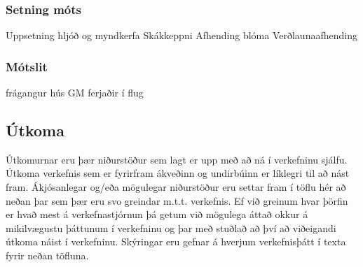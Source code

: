 \documentclass[11pt]{article}
\begin{document}
\subsubsection{Setning móts}
\label{sec-1-1-9}

Uppsetning hljóð og myndkerfa
Skákkeppni
Afhending blóma
Verðlaunaafhending
\subsubsection{Mótslit}
\label{sec-1-1-10}

frágangur hús
GM ferjaðir í flug
\subsection{Útkoma}
\label{sec-1-2}


Útkomurnar eru þær niðurstöður sem lagt er upp með að ná í verkefninu sjálfu.  Útkoma verkefnis sem er 
fyrirfram ákveðinn og undirbúinn er líklegri til að nást fram. Ákjósanlegar og/eða mögulegar niðurstöður
eru settar fram í töflu hér að neðan þar sem þær eru svo greindar m.t.t. verkefnis. Ef við greinum hvar 
þörfin er hvað mest á verkefnastjórnun þá getum við mögulega áttað okkur á mikilvægustu þáttunum í 
verkefninu og þar með stuðlað að því að viðeigandi útkoma náist í verkefninu.  Skýringar eru gefnar á
hverjum verkefnisþátt í texta fyrir neðan töfluna.
\end{document}
